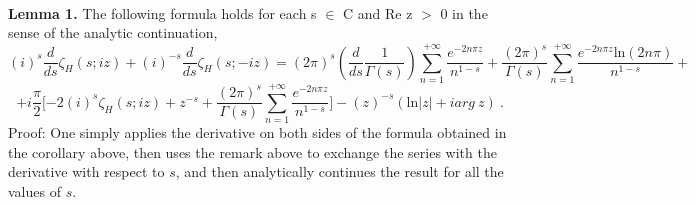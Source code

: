 \documentclass [11pt]{article}
\begin{document}
\\
{\bf Lemma 1.}
The following formula holds for each s $\in$ C and Re z $>$ 0 
in the sense of the analytic continuation,
\begin{equation}\nonumber
(i)^{s}\frac{d}{ds}\zeta_H(s;iz)+ (i)^{-s}\frac{d}{ds}\zeta_H(s;-iz) = 
(2\pi)^s (\frac{d}{ds}\frac{1}{\Gamma(s)})\sum _{n=1}^{+\infty}\frac{e^{-2n\pi{z}}}{n^{1-s}} + 
\frac{(2\pi)^{s}}{\Gamma(s)} \sum _{n=1}^{+\infty}
\frac{e^{-2n\pi{z}}\mbox{ln}(2n\pi)}{n^{1-s}}+
\end{equation}
\begin{equation}
+i\frac{\pi}{2}\lbrack{ -2(i)^{s}\zeta_H(s;iz)+z^{-s} + \frac{(2\pi)^s}{\Gamma(s)}\sum
_{n=1}^{+\infty}\frac{e^{-2n\pi{z}}}{n^{1-s}}}\rbrack -
(z)^{-s}(\mbox{ln}|z| + iarg\:{z})\: . 
\end{equation}
Proof: 
One simply applies the derivative on both sides of the formula obtained in the corollary above, then uses
the remark above to exchange the series with the derivative with respect to $s$,
 and then analytically continues the result for all the values of $s$.\\
\\
\end{document}

